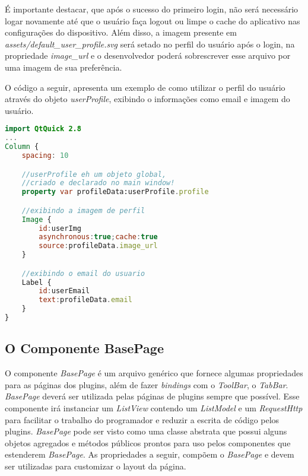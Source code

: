 É importante destacar, que após o sucesso do primeiro login, não será necessário logar novamente até que o usuário faça logout ou limpe o cache do aplicativo nas configurações do dispositivo. Além disso, a imagem presente em \textit{assets/default\_user\_profile.svg} será setado no perfil do usuário após o login, na propriedade \textit{image\_url} e o desenvolvedor poderá sobrescrever esse arquivo por uma imagem de sua preferência.\par

O código a seguir, apresenta um exemplo de como utilizar o perfil do usuário através do objeto \textit{userProfile}, exibindo o informações como email e imagem do usuário.

\begin{center}
\begin{lstlisting}[language=qml]
import QtQuick 2.8
...
Column {
	spacing: 10

	//userProfile eh um objeto global,
	//criado e declarado no main window!
	property var profileData:userProfile.profile

	//exibindo a imagem de perfil
	Image {
		id:userImg
		asynchronous:true;cache:true
		source:profileData.image_url
	}

	//exibindo o email do usuario
	Label {
		id:userEmail
		text:profileData.email
	}
}
\end{lstlisting}
\end{center}


\subsection{O Componente BasePage}\label{sec:solucao-desenvolvida}
O componente \textit{BasePage} é um arquivo genérico que fornece algumas propriedades para as páginas dos plugins, além de fazer \textit{bindings} com o \textit{ToolBar}, o \textit{TabBar}. \textit{BasePage} deverá ser utilizada pelas páginas de plugins sempre que possível. Esse componente irá instanciar um \textit{ListView} contendo um \textit{ListModel} e um \textit{RequestHttp} para facilitar o trabalho do programador e reduzir a escrita de código pelos plugins. \textit{BasePage} pode ser visto como uma classe abstrata que possui alguns objetos agregados e métodos públicos prontos para uso pelos componentes que estenderem \textit{BasePage}. As propriedades a seguir, compõem o \textit{BasePage} e devem ser utilizadas para customizar o layout da página.

